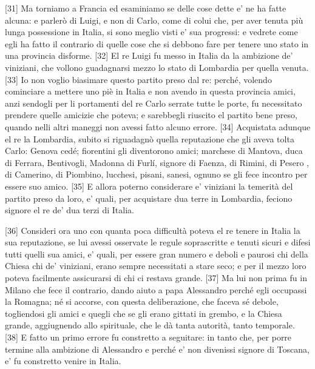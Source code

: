 {[}31{]} Ma torniamo a Francia ed esaminiamo se delle cose dette e' ne
ha fatte alcuna: e parlerò di Luigi, e non di Carlo, come di colui che,
per aver tenuta più lunga possessione in Italia, si sono meglio visti e'
sua progressi: e vedrete come egli ha fatto il contrario di quelle cose
che si debbono fare per tenere uno stato in una provincia disforme.
{[}32{]} El re Luigi fu messo in Italia da la ambizione de' viniziani,
che vollono guadagnarsi mezzo lo stato di Lombardia per quella venuta.
{[}33{]} Io non voglio biasimare questo partito preso dal re: perché,
volendo cominciare a mettere uno piè in Italia e non avendo in questa
provincia amici, anzi sendogli per li portamenti del re Carlo serrate
tutte le porte, fu necessitato prendere quelle amicizie che poteva; e
sarebbegli riuscito el partito bene preso, quando nelli altri maneggi
non avessi fatto alcuno errore. {[}34{]} Acquistata adunque el re la
Lombardia, subito si riguadagnò quella reputazione che gli aveva tolta
Carlo: Genova cedé; fiorentini gli diventorono amici; marchese di
Mantova, duca di Ferrara, Bentivogli, Madonna di Furlí, signore di
Faenza, di Rimini, di Pesero , di Camerino, di Piombino, lucchesi,
pisani, sanesi, ognuno se gli fece incontro per essere suo amico.
{[}35{]} E allora poterno considerare e' viniziani la temerità del
partito preso da loro, e' quali, per acquistare dua terre in Lombardia,
feciono signore el re de' dua terzi di Italia.

{[}36{]} Consideri ora uno con quanta poca difficultà poteva el re
tenere in Italia la sua reputazione, se lui avessi osservate le regule
soprascritte e tenuti sicuri e difesi tutti quelli sua amici, e' quali,
per essere gran numero e deboli e paurosi chi della Chiesa chi de'
viniziani, erano sempre necessitati a stare seco; e per il mezzo loro
poteva facilmente assicurarsi di chi ci restava grande. {[}37{]} Ma lui
non prima fu in Milano che fece il contrario, dando aiuto a papa
Alessandro perché egli occupassi la Romagna; né si accorse, con questa
deliberazione, che faceva sé debole, togliendosi gli amici e quegli che
se gli erano gittati in grembo, e la Chiesa grande, aggiugnendo allo
spirituale, che le dà tanta autorità, tanto temporale. {[}38{]} E fatto
un primo errore fu constretto a seguitare: in tanto che, per porre
termine alla ambizione di Alessandro e perché e' non divenissi signore
di Toscana, e' fu constretto venire in Italia.

